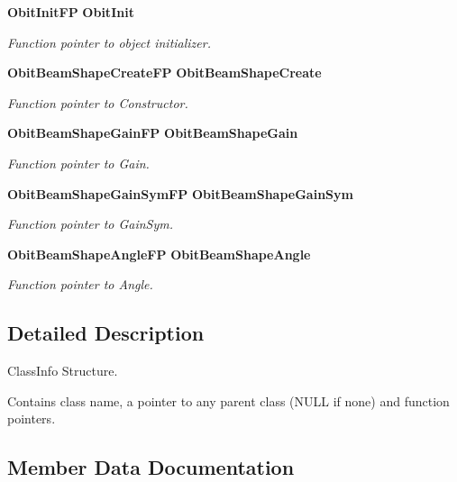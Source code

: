 \begin{CompactItemize}
{\bf Obit\-Init\-FP} {\bf Obit\-Init}
\begin{CompactList}\small\item\em Function pointer to object initializer. \item\end{CompactList}\item 
{\bf Obit\-Beam\-Shape\-Create\-FP} {\bf Obit\-Beam\-Shape\-Create}
\begin{CompactList}\small\item\em Function pointer to Constructor. \item\end{CompactList}\item 
{\bf Obit\-Beam\-Shape\-Gain\-FP} {\bf Obit\-Beam\-Shape\-Gain}
\begin{CompactList}\small\item\em Function pointer to Gain. \item\end{CompactList}\item 
{\bf Obit\-Beam\-Shape\-Gain\-Sym\-FP} {\bf Obit\-Beam\-Shape\-Gain\-Sym}
\begin{CompactList}\small\item\em Function pointer to Gain\-Sym. \item\end{CompactList}\item 
{\bf Obit\-Beam\-Shape\-Angle\-FP} {\bf Obit\-Beam\-Shape\-Angle}
\begin{CompactList}\small\item\em Function pointer to Angle. \item\end{CompactList}\end{CompactItemize}


\subsection{Detailed Description}
Class\-Info Structure. 

Contains class name, a pointer to any parent class (NULL if none) and function pointers. 



\subsection{Member Data Documentation}
